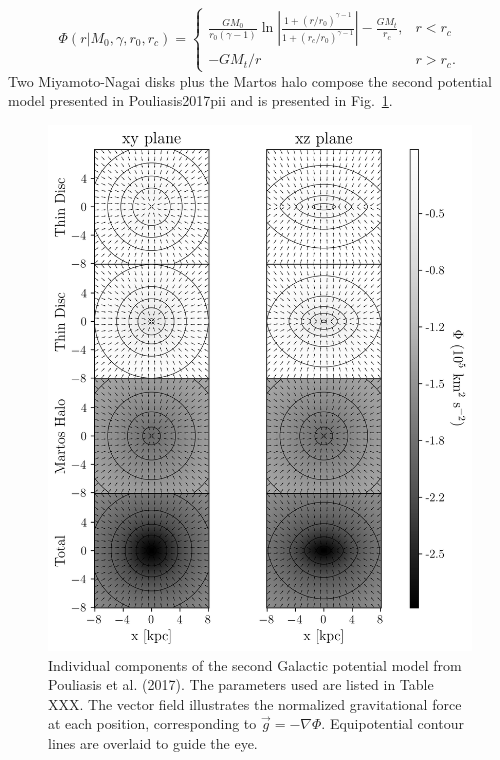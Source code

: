        \begin{equation}
            \Phi(r|M_0,\gamma,r_0,r_c) = 
            \begin{cases}
                \frac{GM_0}{r_0\left(\gamma-1\right)}\ln\left|\frac{1+(r/r_0)^{\gamma-1}}{1+(r_c/r_0)^{\gamma-1}}\right| -\frac{GM_t}{r_c}, & r<r_c\\
                -GM_t/r & r>r_c.
            \end{cases}
        \end{equation}
        Two Miyamoto-Nagai disks plus the Martos halo compose the second potential model presented in Pouliasis2017pii and is presented in Fig.~\ref{fig:figure_pouliasis2017pii_potential}.
        
        \begin{figure}
            \centering
            \includegraphics[width=\linewidth]{images/figure_pouliasis2017pii_potential_-8_8.png}
            \caption{Individual components of the second Galactic potential model from Pouliasis et al. (2017). The parameters used are listed in Table XXX. The vector field illustrates the normalized gravitational force at each position, corresponding to $\vec{g} = -\nabla\Phi$. Equipotential contour lines are overlaid to guide the eye.}
            \label{fig:figure_pouliasis2017pii_potential}
        \end{figure}        
    

